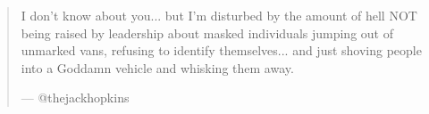 \begin{quote}
\large
I don't know about you... but I'm disturbed by the amount of hell NOT being raised by leadership about masked individuals jumping out of unmarked vans, refusing to identify themselves... and just shoving people into a Goddamn vehicle and whisking them away.

\hfill --- @thejackhopkins
\end{quote}

